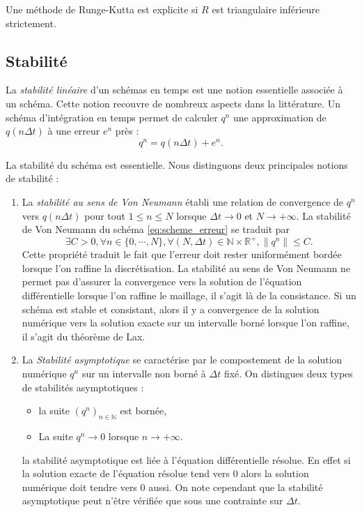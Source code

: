 \begin{proposition}
Une méthode de Runge-Kutta est explicite si $R$ est triangulaire inférieure strictement.
\end{proposition}




\subsection{Stabilité}

La \textit{stabilité linéaire} d'un schémas en temps est une notion essentielle associée à un schéma. Cette notion recouvre de nombreux aspects dans la littérature.
Un schéma d'intégration en temps permet de calculer $q^n$ une approximation de $q(n \Delta t)$ à une erreur $e^n$ près :
\begin{equation}
q^n = q(n \Delta t) + e^n.
\label{eq:scheme_erreur}
\end{equation}

La stabilité du schéma est essentielle. Nous distinguons deux principales notions de stabilité :
\begin{enumerate}
\item La \textit{stabilité au sens de Von Neumann} établi une relation de convergence de $q^n$ vers $q(n \Delta t)$ pour tout $1 \leq n \leq N$ lorsque $\Delta t \rightarrow 0$ et $N \rightarrow + \infty$. 
La stabilité de Von Neumann du schéma \eqref{eq:scheme_erreur} se traduit par
\begin{equation}
\exists C >0, \forall n \in \{ 0 , \cdots , N \}, \forall (N, \Delta t) \in \mathbb{N} \times \mathbb{R}^+, \| q^n \| \leq C.
\end{equation}
Cette propriété traduit le fait que l'erreur doit rester uniformément bordée lorsque l'on raffine la discrétisation. La stabilité au sens de Von Neumann ne permet pas d'assurer la convergence vers la solution de l'équation différentielle lorsque l'on raffine le maillage, il s'agit là de la consistance. Si un schéma est stable et consistant, alors il y a convergence de la solution numérique vers la solution exacte sur un intervalle borné lorsque l'on raffine, il s'agit du théorème de Lax.

\item La \textit{Stabilité asymptotique} se caractérise par le compostement de la solution numérique $q^n$ sur un intervalle non borné à $\Delta t$ fixé. On distingues deux types de stabilités asymptotiques :
\begin{itemize}
\item la suite $(q^n)_{n \in \mathbb{N}}$ est bornée,
\item La suite $q^n \rightarrow 0$ lorsque $n \rightarrow + \infty$.
\end{itemize}
la stabilité asymptotique est liée à l'équation différentielle résolue. En effet si la solution exacte de l'équation résolue tend vers $0$ alors la solution numérique doit tendre vers $0$ aussi. On note cependant que la stabilité asymptotique peut n'être vérifiée que sous une contrainte sur $\Delta t$.
\end{enumerate} 

